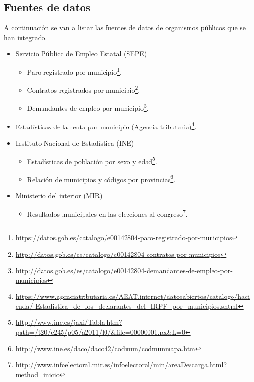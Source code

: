 \subsection{Fuentes de datos}

A continuación se van a listar las fuentes de datos de organismos públicos que se han integrado.

\begin{itemize}
	\tightlist
	\item
	Servicio Público de Empleo Estatal (SEPE)
	\begin{itemize}
		\tightlist
		\item
		Paro registrado por municipio\footnote{\href{https://datos.gob.es/catalogo/e00142804-paro-registrado-por-municipios}{https://datos.gob.es/catalogo/e00142804-paro-registrado-por-municipios}}.
		\item
		Contratos registrados por municipio\footnote{\href{http://datos.gob.es/es/catalogo/e00142804-contratos-por-municipios}{http://datos.gob.es/es/catalogo/e00142804-contratos-por-municipios}}.
		\item
		Demandantes de empleo por municipio\footnote{\href{http://datos.gob.es/es/catalogo/e00142804-demandantes-de-empleo-por-municipios}{http://datos.gob.es/es/catalogo/e00142804-demandantes-de-empleo-por-municipios}}.
	\end{itemize}
	\item 
	Estadísticas de la renta por municipio (Agencia tributaria)\footnote{\href{https://www.agenciatributaria.es/AEAT.internet/datosabiertos/catalogo/hacienda/Estadistica\_de\_los\_declarantes\_del\_IRPF\_por\_municipios.shtml}{https://www.agenciatributaria.es/AEAT.internet/datosabiertos/catalogo/hacienda/ Estadistica\_de\_los\_declarantes\_del\_IRPF\_por\_municipios.shtml}}.
	\item
	Instituto Nacional de Estadística (INE)
	\begin{itemize}
		\item
		Estadísticas de población por sexo y edad\footnote{\href{http://www.ine.es/jaxi/Tabla.htm?path=/t20/e245/p05/a2011/l0/\&file=00000001.px\&L=0}{http://www.ine.es/jaxi/Tabla.htm?path=/t20/e245/p05/a2011/l0/\&file=00000001.px\&L=0}}.
		\item
		Relación de municipios y códigos por provincias\footnote{\href{http://www.ine.es/daco/daco42/codmun/codmunmapa.htm}{http://www.ine.es/daco/daco42/codmun/codmunmapa.htm}}.
	\end{itemize}
	\item
	Ministerio del interior (MIR)
	\begin{itemize}
		\item 
		Resultados municipales en las elecciones al congreso\footnote{\href{http://www.infoelectoral.mir.es/infoelectoral/min/areaDescarga.html?method=inicio}{http://www.infoelectoral.mir.es/infoelectoral/min/areaDescarga.html?method=inicio}}.
	\end{itemize}
\end{itemize}


